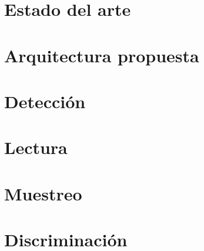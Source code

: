 \documentclass[11pt,letterpaper,oneside]{phstylee}
\begin{document}
\newpage
\thispagestyle{empty}
\cleardoublepage

%
%

\chapter{Estado del arte}
\label{cap:art}


\newpage
\thispagestyle{empty}
\cleardoublepage

\chapter{Arquitectura propuesta}
\label{cap:arq}




\newpage
\thispagestyle{empty}
\cleardoublepage

\chapter{Detección}
\label{cap:stgc}


\newpage
\thispagestyle{empty}
\cleardoublepage

\chapter{Lectura}
\label{cap:asd}


\newpage
\thispagestyle{empty}
\cleardoublepage

\chapter{Muestreo}
\label{cap:sampling}


\newpage
\thispagestyle{empty}
\cleardoublepage

\chapter{Discriminación}
\label{cap:discriminator}


\newpage
\thispagestyle{empty}
\cleardoublepage
\end{document}
